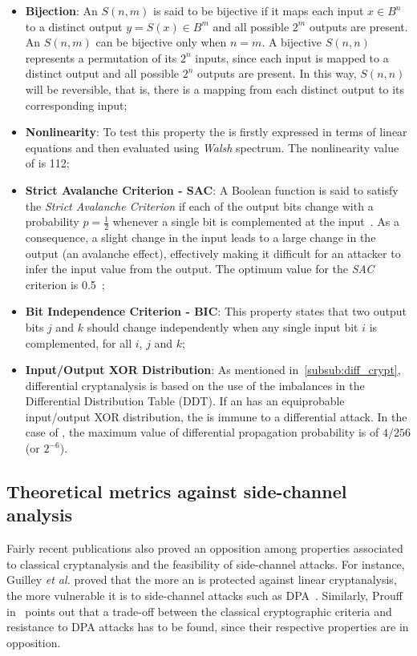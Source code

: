         \begin{itemize}
            \item \textbf{Bijection}: An \sbocs{} $S(n, m)$ is said to be bijective if it maps each input $x \in B^n$ to a distinct output $y = S(x) \in B^m$ and all possible $2^m$ outputs are present. An \sbocs{} $S(n, m)$ can be bijective only when $n = m$. A bijective \sbocs{} $S(n, n)$ represents a permutation of its $2^n$ inputs, since each input is mapped to a distinct output and all possible $2^n$ outputs are present. In this way, $S(n, n)$ will be reversible, that is, there is a mapping from each distinct output to its corresponding input;
            \item \textbf{Nonlinearity}: To test this property the \sbocs{} is firstly expressed in terms of linear equations and then evaluated using \emph{Walsh} spectrum. The nonlinearity value of \aes{} \sbocs{} is 112;
            \item \textbf{Strict Avalanche Criterion - SAC}: A Boolean function is said to satisfy the \emph{Strict Avalanche Criterion} if each of the output bits change with a probability $p = \frac{1}{2}$ whenever a single bit is complemented at the input~\cite{forrie1988strict}. As a consequence, a slight change in the input leads to a large change in the output (an avalanche effect), effectively making it difficult for an attacker to infer the input value from the output. The optimum value for the \emph{SAC} criterion is 0.5~\cite{accikkapi2019side};
            \item \textbf{Bit Independence Criterion - BIC}: This property states that two output bits $j$ and $k$ should change independently when any single input bit $i$ is complemented, for all $i$, $j$ and $k$;
            \item \textbf{Input/Output XOR Distribution}: As mentioned in~\ref{subsub:diff_crypt}, differential cryptanalysis is based on the use of the imbalances in the Differential Distribution Table (DDT). If an \sbocs{} has an equiprobable input/output XOR distribution, the \sbocs{} is immune to a differential attack. In the case of \aes{}, the maximum value of differential propagation probability is of $4/256$ (or $2^{-6}$).
        \end{itemize}

    \subsection{Theoretical metrics against side-channel analysis}
        Fairly recent publications also proved an opposition among properties associated to classical cryptanalysis and the feasibility of side-channel attacks. For instance, Guilley \emph{et al.} proved that the more an \sbocs{} is protected against linear cryptanalysis, the more vulnerable it is to side-channel attacks such as DPA~\cite{guilley2004differential}. Similarly, Prouff in~\cite{prouff2005dpa} points out that a trade-off between the classical cryptographic criteria and resistance to DPA attacks has to be found, since their respective properties are in opposition.

